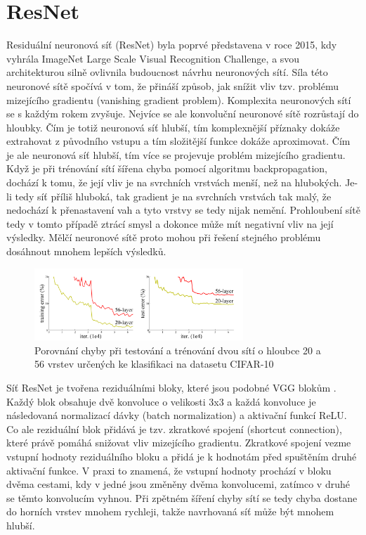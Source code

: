 \section{ResNet}
Residuální neuronová síť (ResNet) \cite{ResNet} byla poprvé představena v roce 2015, kdy vyhrála ImageNet Large Scale Visual Recognition Challenge, a svou architekturou silně ovlivnila budoucnost návrhu neuronových sítí.
Síla této neuronové sítě spočívá v tom, že přináší způsob, jak snížit vliv tzv. problému mizejícího gradientu (vanishing gradient problem).
Komplexita neuronových sítí se s každým rokem zvyšuje. Nejvíce se ale konvoluční neuronové sítě rozrůstají do hloubky. Čím je totiž neuronová síť hlubší, tím komplexnější příznaky dokáže extrahovat z původního vstupu a tím složitější funkce dokáže aproximovat.
Čím je ale neuronová síť hlubší, tím více se projevuje problém mizejícího gradientu.
Když je při trénování sítí šířena chyba pomocí algoritmu backpropagation, dochází k tomu, že její vliv je na svrchních vrstvách menší, než na hlubokých. Je-li tedy síť příliš hluboká, tak gradient je na svrchních vrstvách tak malý, že nedochází k přenastavení vah a tyto vrstvy se tedy nijak nemění.
Prohloubení sítě tedy v tomto případě ztrácí smysl a dokonce může mít negativní vliv na její výsledky.
Mělčí neuronové sítě proto mohou při řešení stejného problému dosáhnout mnohem lepších výsledků.

\begin{figure}[h!]
	\centering
	\includegraphics[width=0.7\textwidth]{Figures/solution/vanishing_gradient.png}
	\caption{Porovnání chyby při testování a trénování dvou sítí o hloubce 20 a 56 vrstev určených ke klasifikaci na datasetu CIFAR-10 \cite{ResNet}}
\end{figure}

Síť ResNet je tvořena reziduálními bloky, které jsou podobné VGG blokům \cite{VGG}.
Každý blok obsahuje dvě konvoluce o velikosti 3x3 a každá konvoluce je následovaná normalizací dávky (batch normalization) a aktivační funkcí ReLU.
Co ale reziduální blok přidává je tzv. zkratkové spojení (shortcut connection), které právě pomáhá snižovat vliv mizejícího gradientu.
Zkratkové spojení vezme vstupní hodnoty reziduálního bloku a přidá je k hodnotám před spuštěním druhé aktivační funkce.
V praxi to znamená, že vstupní hodnoty prochází v bloku dvěma cestami, kdy v jedné jsou změněny dvěma konvolucemi, zatímco v druhé se těmto konvolucím vyhnou. Při zpětném šíření chyby sítí se tedy chyba dostane do horních vrstev mnohem rychleji, takže navrhovaná síť může být mnohem hlubší.

